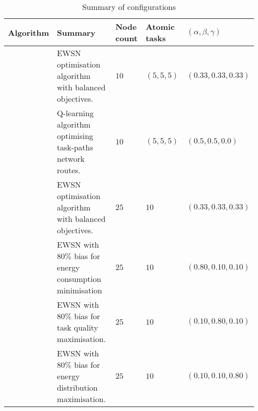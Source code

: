 
\begin{table}[h]
	\begin{tabular}
		{|p{}|p{}|p{}|p{}|p{}|}
		\hline
		\textbf{Algorithm} & \textbf{Summary} & \textbf{Node count} & \textbf{Atomic tasks}  & \textbf{$(\alpha,\beta,\gamma)$}\\
		\hline
		\algorithmBalanced{}{} &  EWSN optimisation algorithm with balanced objectives. & $10$  & $(5,5,5)$   & $(0.33,0.33,0.33)$  \\
		\algorithmQRouting{}{} &  Q-learning algorithm optimising task-paths network routes.  & $10$  & $(5,5,5)$   & $(0.5,0.5,0.0)$  \\
		\algorithmBalancedExt{}{} &  EWSN optimisation algorithm with balanced objectives. & $25$ & $10$    & $(0.33,0.33,0.33)$  \\
		\algorithmEnergy{}{} & EWSN with $80\%$ bias for energy consumption minimisation  & $25$ & $10$   & $(0.80,0.10,0.10)$  \\
		\algorithmQuality{}{} & EWSN with $80\%$ bias for task quality maximisation. & $25$ & $10$   & $(0.10,0.80,0.10)$  \\
		\algorithmDistribution{}{} & EWSN with $80\%$ bias for energy distribution maximisation. & $25$ & $10$  & $(0.10,0.10,0.80)$  \\
		\hline
	\end{tabular}
	\captionsetup{labelfont=bf,singlelinecheck=on}
	\caption{Summary of configurations}
	\label{table:summary_of_configurations}
\end{table}

